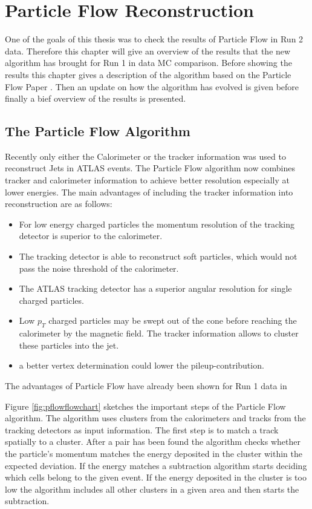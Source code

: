 \chapter{Particle Flow Reconstruction}

One of the goals of this thesis was to check the results of Particle Flow in Run 2 data. Therefore this chapter will give an overview of the results that the new algorithm has brought for Run 1 in data MC comparison. Before showing the results this chapter gives a description of the algorithm based on the Particle Flow Paper \cite{pflow16}. Then an update on how the algorithm has evolved is given before finally a bief overview of the results is presented.

\section{The Particle Flow Algorithm}

Recently only either the Calorimeter or the tracker information was used to reconstruct Jets in ATLAS events. The Particle Flow algorithm now combines tracker and calorimeter information to achieve better resolution especially at lower energies. The main advantages of including the tracker information into reconstruction are as follows:


\begin{itemize}
\item For low energy charged particles the momentum resolution of the tracking detector is superior to the calorimeter.
\item The tracking detector is able to reconstruct soft particles, which would not pass the noise threshold of the calorimeter.
\item The ATLAS tracking detector has a superior angular resolution for single charged particles.
\item Low $p_T$ charged particles may be swept out of the cone before reaching the calorimeter by the magnetic field. The tracker information allows to cluster these particles into the jet.
\item a better vertex determination could lower the pileup-contribution.
\end{itemize}

The advantages of Particle Flow have already been shown for Run 1 data in

Figure \ref{fig:pflowflowchart} sketches the important steps of the Particle Flow algorithm. The algorithm uses clusters from the calorimeters and tracks from the tracking detectors as input information. The first step is to match a track spatially to a cluster. After a pair has been found the algorithm checks whether the particle's momentum matches the energy deposited in the cluster within the expected deviation. If the energy matches a subtraction algorithm starts deciding which cells belong to the given event. If the energy deposited in the cluster is too low the algorithm includes all other clusters in a given area and then starts the subtraction.

